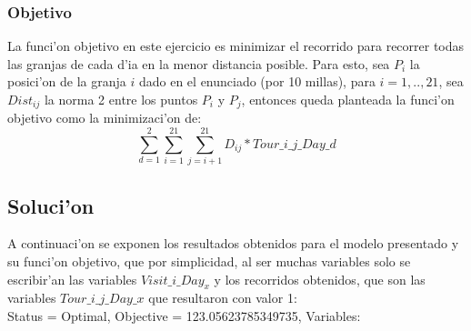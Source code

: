 \subsubsection{Objetivo}
La funci'on objetivo en este ejercicio es minimizar el recorrido para recorrer todas las granjas de cada d'ia en la menor distancia posible. Para esto, sea $P_i$ la posici'on de la granja $i$ dado en el enunciado (por 10 millas), para $i = 1,..,21$, sea $Dist_{ij}$ la norma 2 entre los puntos $P_i$ y $P_j$, entonces queda planteada la funci'on objetivo como la minimizaci'on de:
\begin{equation}
\sum_{d=1}^{2} \sum_{i=1}^{21} \sum_{j=i+1}^{21} D_{ij} * Tour\_i\_j\_Day\_d
\end{equation}
\subsection{Soluci'on}
A continuaci'on se exponen los resultados obtenidos para el modelo presentado y su funci'on objetivo, que por simplicidad, al ser muchas variables solo se escribir'an las variables $Visit\_i\_Day_x$ y los recorridos obtenidos, que son las variables $Tour\_i\_j\_Day\_x$ que resultaron con valor 1: \\
Status = Optimal, Objective = 123.05623785349735, Variables: \\
